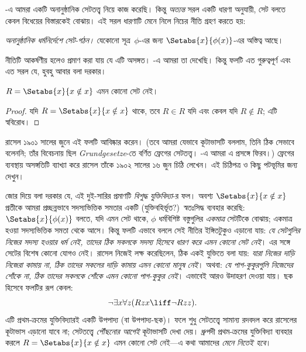 \documentclass[../../../include/open-logic-section]{subfiles}
\begin{document}

-এ আমরা একটি অনানুষ্ঠানিক সেটতত্ত্ব নিয়ে কাজ
করেছি। কিন্তু \emph{অত্যন্ত} সরল একটি ধারণা অনুযায়ী, সেট বলতে
কেবল বিধেয়ের বিস্তারকেই বোঝায়। এই সরল ধারণাটি মেনে নিলে
নিচের নীতি গ্রহণ করতে হয়:

\begin{defish}
  \emph{অনানুষ্ঠানিক ধর্মনির্দেশে সেট-গঠন।} যেকোনো সূত্র~$\phi$-এর জন্য
  $\Setabs{x}{\phi(x)}$-এর অস্তিত্ব আছে।
\end{defish}

নীতিটি আকর্ষণীয় হলেও প্রমাণ করা যায় যে এটি অসঙ্গত।
-এ আমরা তা দেখেছি। কিন্তু ফলটি
এত গুরুত্বপূর্ণ এবং এত সরল যে, হুবহু আবার বলা দরকার।

\begin{thm}[রাসেলের কূটাভাস]
$R = \Setabs{x}{x \notin x}$ এমন কোনো সেট নেই।
\end{thm}

\begin{proof}
যদি $R = \Setabs{x}{x \notin x}$ থাকে, তবে $R \in R$
যদি এবং কেবল যদি $R \notin R$; এটি স্ববিরোধ।
\end{proof}

রাসেল ১৯০১ সালের জুনে এই ফলটি আবিষ্কার করেন। (তবে আমরা যেভাবে
কূটাভাসটি বললাম, তিনি ঠিক সেভাবে বলেননি; তাঁর বিবেচনায় ছিল
\emph{Grundgesetze}-তে বর্ণিত ফ্রেগের সেটতত্ত্ব।
-এ আমরা এ প্রসঙ্গে ফিরব।) ফ্রেগের ব্যবস্থায়
অসঙ্গতিটি ব্যাখ্যা করে রাসেল তাঁকে ১৯০২ সালের ১৬ জুন চিঠি লেখেন।
এই চিঠিপত্র ও কিছু পটভূমির জন্য
\citet[pp.~124--8]{Heijenoort1967} দেখুন।

জোর দিয়ে বলা দরকার যে, এই দুই-সারির প্রমাণটি \emph{বিশুদ্ধ
যুক্তিবিদ্যা}-র ফল। অবশ্য $\Setabs{x}{x \notin x}$ প্রতীকে
আমরা প্রচ্ছন্নভাবে সদস্যভিত্তিক সমতার একটি (যুক্তিবহির্ভূত?)\
স্বতঃসিদ্ধ ব্যবহার করেছি: $\Setabs{x}{\phi(x)}$ বলতে, যদি
এমন সেট থাকে, $\phi$ ধর্মবিশিষ্ট বস্তুগুলির \emph{একমাত্র}
সেটটিকে বোঝায়; একমাত্র হওয়া সদস্যভিত্তিক সমতা থেকে আসে।
কিন্তু ফলটি এভাবে বললে সেই নীতির ইঙ্গিতটুকুও এড়ানো যায়:
\emph{যে সেটগুলির নিজের সদস্য হওয়ার ধর্ম নেই, তাদের ঠিক সকলকে
সদস্য হিসেবে ধারণ করে এমন কোনো সেট নেই}। এর সঙ্গে সেটের
বিশেষ কোনো যোগও নেই। রাসেল নিজেই লক্ষ করেছিলেন, ঠিক একই
যুক্তিতে বলা যায়: \emph{যারা নিজের দাড়ি নিজেরা কামায় না,
ঠিক তাদের সকলের দাড়ি কামায় এমন কোনো মানুষ নেই}। অথবা:
\emph{যে পাগ-কুকুরগুলি নিজেদের শোঁকে না, ঠিক তাদের সকলকে শোঁকে
এমন কোনো পাগ-কুকুর নেই}। এভাবেই আরও উদাহরণ দেওয়া যায়।
ছক হিসেবে ফলটির রূপ কেবল:
\[
\lnot \exists x \forall z(Rzx \liff \lnot R zz).
\]
এটি প্রথম-ক্রমের যুক্তিবিদ্যারই একটি উপপাদ্য (বা উপপাদ্য-ছক)।
ফলে শুধু সেটতত্ত্বে সামান্য রদবদল করে রাসেলের কূটাভাস এড়ানো
যাবে না; সেটতত্ত্বে \emph{পৌঁছনোর আগেই} কূটাভাসটি দেখা দেয়।
ধ্রুপদী প্রথম-ক্রমের যুক্তিবিদ্যা ব্যবহার করলে
$R = \Setabs{x}{x\notin x}$ এমন কোনো সেট নেই—এ কথা
আমাদের \emph{মেনে নিতেই হবে}।
\end{document}
